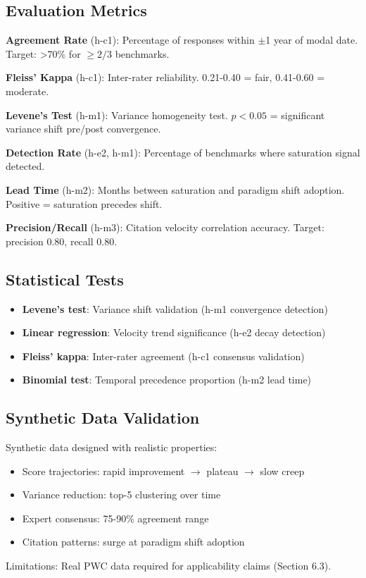 \subsection{Evaluation Metrics}

\textbf{Agreement Rate} (h-c1): Percentage of responses within $\pm$1 year of modal date. Target: >70\% for $\geq 2/3$ benchmarks.

\textbf{Fleiss' Kappa} (h-c1): Inter-rater reliability. 0.21-0.40 = fair, 0.41-0.60 = moderate.

\textbf{Levene's Test} (h-m1): Variance homogeneity test. $p<0.05$ = significant variance shift pre/post convergence.

\textbf{Detection Rate} (h-e2, h-m1): Percentage of benchmarks where saturation signal detected.

\textbf{Lead Time} (h-m2): Months between saturation and paradigm shift adoption. Positive = saturation precedes shift.

\textbf{Precision/Recall} (h-m3): Citation velocity correlation accuracy. Target: precision 0.80, recall 0.80.

\subsection{Statistical Tests}

\begin{itemize}
\item \textbf{Levene's test}: Variance shift validation (h-m1 convergence detection)
\item \textbf{Linear regression}: Velocity trend significance (h-e2 decay detection)
\item \textbf{Fleiss' kappa}: Inter-rater agreement (h-c1 consensus validation)
\item \textbf{Binomial test}: Temporal precedence proportion (h-m2 lead time)
\end{itemize}

\subsection{Synthetic Data Validation}

Synthetic data designed with realistic properties:
\begin{itemize}
\item Score trajectories: rapid improvement $\rightarrow$ plateau $\rightarrow$ slow creep
\item Variance reduction: top-5 clustering over time
\item Expert consensus: 75-90\% agreement range
\item Citation patterns: surge at paradigm shift adoption
\end{itemize}

Limitations: Real PWC data required for applicability claims (Section 6.3).
